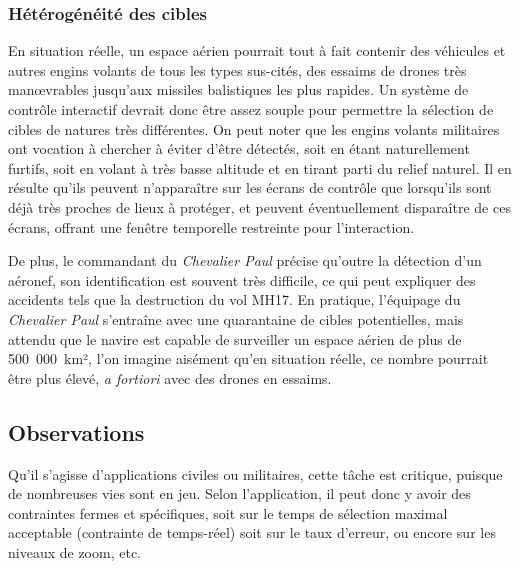 	\subsubsection{Hétérogénéité des cibles}
	En situation réelle, un espace aérien pourrait tout à fait contenir des véhicules et autres engins volants de tous les types sus-cités, des essaims de drones très manœvrables jusqu'aux missiles balistiques les plus rapides. Un système de contrôle interactif devrait donc être assez souple pour permettre la sélection de cibles de natures très différentes.
	On peut noter que les engins volants militaires ont vocation à chercher à éviter d'être détectés, soit en étant naturellement furtifs, soit en volant à très basse altitude et en tirant parti du relief naturel. Il en résulte qu'ils peuvent n'apparaître sur les écrans de contrôle que lorsqu'ils sont déjà très proches de lieux à protéger, et peuvent éventuellement disparaître de ces écrans, offrant une fenêtre temporelle restreinte pour l'interaction.
	
	De plus, le commandant du \emph{Chevalier Paul}\footnotemark{} précise qu'outre la détection d'un aéronef, son identification est souvent très difficile, ce qui peut expliquer des accidents tels que la destruction du vol MH17\footnotemark{}. En pratique, l'équipage du \emph{Chevalier Paul} s'entraîne avec une quarantaine de cibles potentielles, mais attendu que le navire est capable de surveiller un espace aérien de plus de 500~000~km², l'on imagine aisément qu'en situation réelle, ce nombre pourrait être plus élevé, \emph{a fortiori} avec des drones en essaims.
	
	\addtocounter{footnote}{-1}
	\addtocounter{footnote}{1}
	
	\FloatBarrier \subsection{Observations}
	Qu'il s'agisse d'applications civiles ou militaires, cette tâche est critique, puisque de nombreuses vies sont en jeu. Selon l'application, il peut donc y avoir des contraintes fermes et spécifiques, soit sur le temps de sélection maximal acceptable (contrainte de temps-réel) soit sur le taux d'erreur, ou encore sur les niveaux de zoom, etc.

